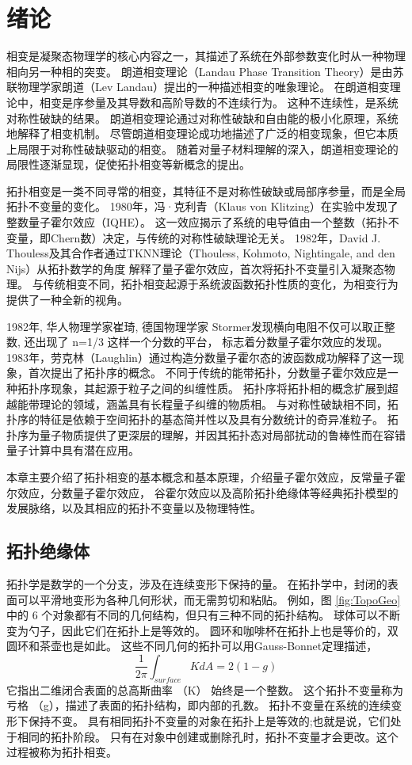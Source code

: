\chapter{绪论}
相变是凝聚态物理学的核心内容之一，其描述了系统在外部参数变化时从一种物理相向另一种相的突变。
朗道相变理论（Landau Phase Transition Theory）是由苏联物理学家朗道（Lev Landau）提出的一种描述相变的唯象理论\cite{landau1937theory,landau1980statistical}。
在朗道相变理论中，相变是序参量及其导数和高阶导数的不连续行为。
这种不连续性，是系统对称性破缺的结果。
朗道相变理论通过对称性破缺和自由能的极小化原理，系统地解释了相变机制。
尽管朗道相变理论成功地描述了广泛的相变现象，但它本质上局限于对称性破缺驱动的相变。
随着对量子材料理解的深入，朗道相变理论的局限性逐渐显现，促使拓扑相变等新概念的提出。

拓扑相变是一类不同寻常的相变，其特征不是对称性破缺或局部序参量，而是全局拓扑不变量的变化。
1980年，冯·克利青（Klaus von Klitzing）在实验中发现了整数量子霍尔效应（IQHE）\cite{klitzing1980new}。
这一效应揭示了系统的电导值由一个整数（拓扑不变量，即Chern数）决定，与传统的对称性破缺理论无关。
1982年，David J. Thouless及其合作者通过TKNN理论（Thouless, Kohmoto, Nightingale, and den Nijs）从拓扑数学的角度
解释了量子霍尔效应\cite{thouless1982quantized}，首次将拓扑不变量引入凝聚态物理。
与传统相变不同，拓扑相变起源于系统波函数拓扑性质的变化，为相变行为提供了一种全新的视角。

1982年, 华人物理学家崔琦, 德国物理学家 Stormer发现横向电阻不仅可以取正整数, 还出现了 n=1/3 这样一个分数的平台\cite{tsui1982two}，
标志着分数量子霍尔效应的发现。
1983年，劳克林（Laughlin）通过构造分数量子霍尔态的波函数成功解释了这一现象\cite{laughlin1983anomalous}，首次提出了拓扑序的概念。
不同于传统的能带拓扑，分数量子霍尔效应是一种拓扑序现象，其起源于粒子之间的纠缠性质。
拓扑序将拓扑相的概念扩展到超越能带理论的领域，涵盖具有长程量子纠缠的物质相。
与对称性破缺相不同，拓扑序的特征是依赖于空间拓扑的基态简并性以及具有分数统计的奇异准粒子。
拓扑序为量子物质提供了更深层的理解，并因其拓扑态对局部扰动的鲁棒性而在容错量子计算中具有潜在应用。

本章主要介绍了拓扑相变的基本概念和基本原理，介绍量子霍尔效应，反常量子霍尔效应，分数量子霍尔效应，
谷霍尔效应以及高阶拓扑绝缘体等经典拓扑模型的发展脉络，以及其相应的拓扑不变量以及物理特性。
\section{拓扑绝缘体}
拓扑学是数学的一个分支，涉及在连续变形下保持的量。
在拓扑学中，封闭的表面可以平滑地变形为各种几何形状，而无需剪切和粘贴。
例如，图 \ref{fig:TopoGeo} 中的 6 个对象都有不同的几何结构，但只有三种不同的拓扑结构。
球体可以不断变为勺子，因此它们在拓扑上是等效的。
圆环和咖啡杯在拓扑上也是等价的，双圆环和茶壶也是如此。
这些不同几何的拓扑可以用Gauss-Bonnet定理描述，
\begin{equation}
	\frac{1}{2\pi}\int_{surface}KdA=2(1-g)
\end{equation}
它指出二维闭合表面的总高斯曲率 （K） 始终是一个整数。
这个拓扑不变量称为亏格 （g），描述了表面的拓扑结构，即内部的孔数。
拓扑不变量在系统的连续变形下保持不变。
具有相同拓扑不变量的对象在拓扑上是等效的;也就是说，它们处于相同的拓扑阶段。
只有在对象中创建或删除孔时，拓扑不变量才会更改。这个过程被称为拓扑相变。

